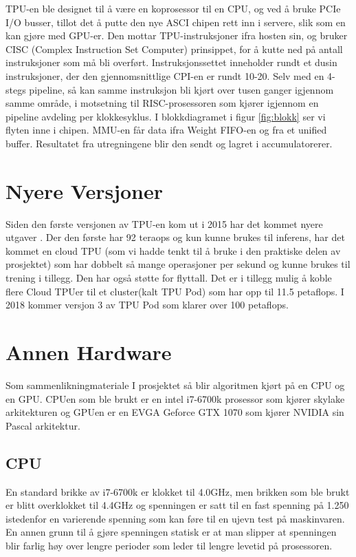 TPU-en ble designet til å være en koprosessor til en CPU, og ved å bruke PCIe I/O busser, tillot det å putte den nye ASCI chipen rett inn i servere, slik som en kan gjøre med GPU-er. Den mottar TPU-instruksjoner ifra hosten sin, og bruker CISC (Complex Instruction Set Computer) prinsippet, for å kutte ned på antall instruksjoner som må bli overført. Instruksjonssettet inneholder rundt et dusin instruksjoner, der den gjennomsnittlige CPI-en er rundt 10-20. Selv med en 4-stegs pipeline, så kan samme instruksjon bli kjørt over tusen ganger igjennom samme område, i motsetning til RISC-prosessoren som kjører igjennom en pipeline avdeling per klokkesyklus. 
I blokkdiagramet i figur \ref{fig:blokk} ser vi flyten inne i chipen. MMU-en får data ifra Weight FIFO-en og fra et unified buffer. Resultatet fra utregningene blir den sendt og lagret i accumulatorerer.

\newpage
\section{Nyere Versjoner}
Siden den første versjonen av TPU-en kom ut i 2015 har det kommet nyere utgaver \cite{tpu_video}. Der den første har 92 teraops og kun kunne brukes til inferens, har det kommet en cloud TPU (som vi hadde tenkt til å bruke i den praktiske delen av prosjektet) som har dobbelt så mange operasjoner per sekund og kunne brukes til trening i tillegg. Den har også støtte for flyttall. Det er i tillegg mulig å koble flere Cloud TPUer til et cluster(kalt TPU Pod) som har opp til 11.5 petaflops. I 2018 kommer versjon 3 av TPU Pod som klarer over 100 petaflops.


\newpage
\section{Annen Hardware}
Som sammenlikningmateriale I prosjektet så blir algoritmen kjørt på en CPU og en GPU. CPUen som ble brukt er en intel i7-6700k prosessor som kjører skylake arkitekturen og GPUen er en EVGA  Geforce GTX 1070 som kjører NVIDIA sin Pascal arkitektur.

\subsection{CPU}
En standard brikke av i7-6700k er klokket til 4.0GHz, men brikken som ble brukt er blitt overklokket til 4.4GHz og spenningen er satt til en fast spenning på 1.250 istedenfor en varierende spenning som kan føre til en ujevn test på maskinvaren. En annen grunn til å gjøre spenningen statisk er at man slipper at spenningen blir farlig høy over lengre perioder som leder til lengre levetid på prosessoren.

